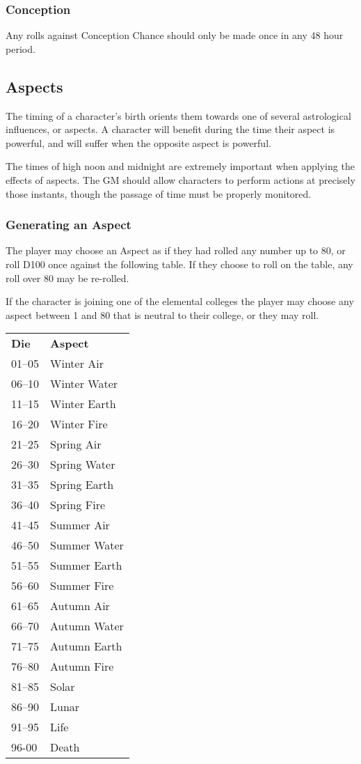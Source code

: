 \begin{multicols*}{3}
\subsubsection{Conception}

Any rolls against Conception Chance should only be made once in any 48
hour period.


\subsection{Aspects}
\label{chargen:aspect}

The timing of a character's birth orients them towards one of several
astrological influences, or aspects. A character will benefit during
the time their aspect is powerful, and will suffer when the opposite
aspect is powerful.

The times of high noon and midnight are extremely important when
applying the effects of aspects. The GM should allow characters to
perform actions at precisely those instants, though the passage of
time must be properly monitored.

\subsubsection{Generating an Aspect}

The player may choose an Aspect as if they had rolled any number up to
80, or roll D100 once against the following table. If they choose to
roll on the table, any roll over 80 may be re-rolled.

If the character is joining one of the elemental colleges the player
may choose any aspect between 1 and 80 that is neutral to their
college, or they may roll.


\begin{tabular}{ll}
\textbf{Die} & \textbf{Aspect} \\
01--05		& Winter Air \\
06--10		& Winter Water \\
11--15		& Winter Earth \\
16--20		& Winter Fire \\
21--25		& Spring Air \\
26--30		& Spring Water \\
31--35		& Spring Earth \\
36--40		& Spring Fire \\
41--45		& Summer Air \\
46--50		& Summer Water \\
51--55		& Summer Earth \\
56--60		& Summer Fire \\
61--65		& Autumn Air \\
66--70		& Autumn Water \\
71--75		& Autumn Earth \\
76--80		& Autumn Fire \\
81--85		& Solar \\
86--90		& Lunar \\
91--95		& Life \\
96-00		& Death \\
\end{tabular}


\end{multicols*}
